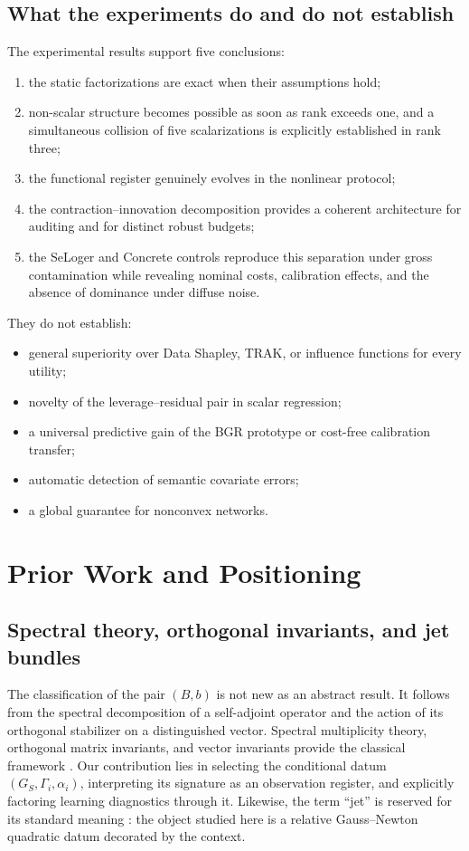 \documentclass[10pt,a4paper]{article}
\begin{document}
\subsection{What the experiments do and do not establish}
The experimental results support five conclusions:
\begin{enumerate}
  \item the static factorizations are exact when their assumptions hold;
  \item non-scalar structure becomes possible as soon as rank exceeds one, and a simultaneous collision of five scalarizations is explicitly established in rank three;
  \item the functional register genuinely evolves in the nonlinear protocol;
  \item the contraction--innovation decomposition provides a coherent architecture for auditing and for distinct robust budgets;
  \item the SeLoger and Concrete controls reproduce this separation under gross contamination while revealing nominal costs, calibration effects, and the absence of dominance under diffuse noise.
\end{enumerate}
They do not establish:
\begin{itemize}
  \item general superiority over Data Shapley, TRAK, or influence functions for every utility;
  \item novelty of the leverage--residual pair in scalar regression;
  \item a universal predictive gain of the BGR prototype or cost-free calibration transfer;
  \item automatic detection of semantic covariate errors;
  \item a global guarantee for nonconvex networks.
\end{itemize}

\section{Prior Work and Positioning}
\label{sec:related-work}
\subsection{Spectral theory, orthogonal invariants, and jet bundles}
The classification of the pair $(B,b)$ is not new as an abstract result. It follows from the spectral decomposition of a self-adjoint operator and the action of its orthogonal stabilizer on a distinguished vector. Spectral multiplicity theory, orthogonal matrix invariants, and vector invariants provide the classical framework \citep{halmos1951,weyl1946,sibirskii1967,sibirskii1968,khadzhiev1967}. Our contribution lies in selecting the conditional datum $(G_S,\Gamma_i,\alpha_i)$, interpreting its signature as an observation register, and explicitly factoring learning diagnostics through it. Likewise, the term ``jet'' is reserved for its standard meaning \citep{saunders1989}: the object studied here is a relative Gauss--Newton quadratic datum decorated by the context.
\end{document}
